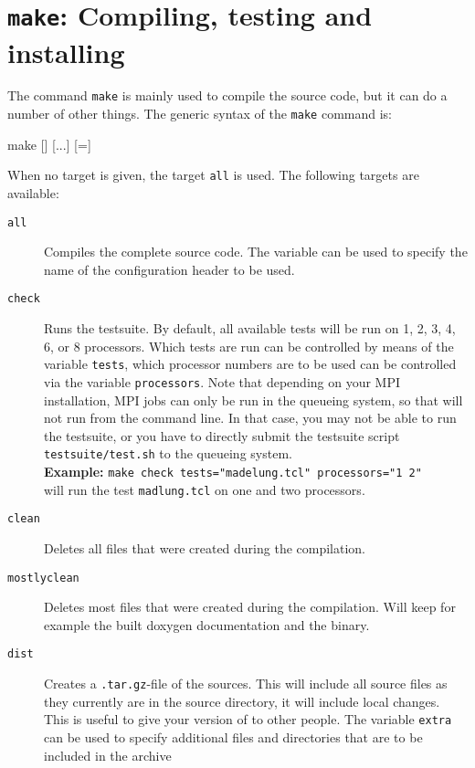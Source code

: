 \section{\texttt{make}: Compiling,  testing and installing \es}
\label{sec:make}

The command \texttt{make} is mainly used to compile the \es source
code, but it can do a number of other things. The generic syntax of
the \texttt{make} command is:
\begin{code}
make [] [...] [=]
\end{code}
When no target is given, the target \texttt{all} is used. The
following targets are available:
\begin{description}
\item[\texttt{all}] Compiles the complete \es source code. The
  variable  can be used to specify the name of the
  configuration header to be used.
\item[\texttt{check}] Runs the testsuite. By default, all available
  tests will be run on 1, 2, 3, 4, 6, or 8 processors. Which tests are
  run can be controlled by means of the variable \texttt{tests}, which
  processor numbers are to be used can be controlled via the variable
  \texttt{processors}. Note that depending on your MPI installation,
  MPI jobs can only be run in the queueing system, so that \es{} will
  not run from the command line. In that case, you may not be able to
  run the testsuite, or you have to directly submit the testsuite script
  \verb!testsuite/test.sh! to the queueing system.\\
  \textbf{Example:} \verb!make check tests="madelung.tcl" processors="1 2"!\\
  will run the test \texttt{madlung.tcl} on one and two processors.
\item[\texttt{clean}] Deletes all files that were created during the
  compilation.
\item[\texttt{mostlyclean}] Deletes most files that were created
  during the compilation. Will keep for example the built doxygen
  documentation and the \es{} binary.
\item[\texttt{dist}] Creates a \texttt{.tar.gz}-file of the \es{}
  sources.  This will include all source files as they currently are
  in the source directory, \ie{} it will include local changes.  This
  is useful to give your version of \es{} to other people.
  The variable \texttt{extra} can be used to specify additional
  files and directories that are to be included in the archive

\end{description}
